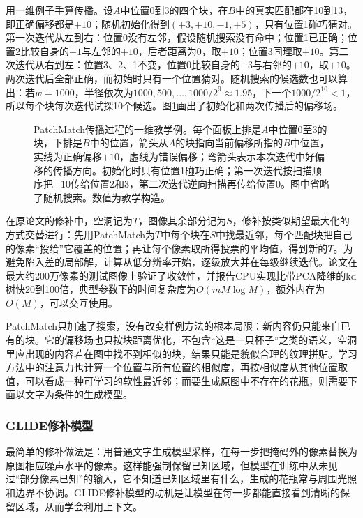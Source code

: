 用一维例子手算传播。设$A$中位置0到3的四个块，在$B$中的真实匹配都在10到13，即正确偏移都是$+10$；随机初始化得到$(+3,+10,-1,+5)$，只有位置1碰巧猜对。第一次迭代从左到右：位置0没有左邻，假设随机搜索没有命中；位置1已正确；位置2比较自身的$-1$与左邻的$+10$，后者距离为0，取$+10$；位置3同理取$+10$。第二次迭代从右到左：位置3、2、1不变，位置0比较自身的$+3$与右邻的$+10$，取$+10$。两次迭代后全部正确，而初始时只有一个位置猜对。随机搜索的候选数也可以算出：若$w=1000$，半径依次为$1000,500,\ldots,1000/2^9\approx1.95$，下一个$1000/2^{10}<1$，所以每个块每次迭代试探10个候选。图\ref{fig:vision-patchmatch-steps}画出了初始化和两次传播后的偏移场。

\begin{figure}[htbp]
 \centering
 
 \caption{PatchMatch传播过程的一维教学例。每个面板上排是$A$中位置0至3的块，下排是$B$中的位置，箭头从$A$的块指向当前偏移所指的$B$中位置，实线为正确偏移$+10$，虚线为错误偏移；弯箭头表示本次迭代中好偏移的传播方向。初始化时只有位置1碰巧正确；第一次迭代按扫描顺序把$+10$传给位置2和3，第二次迭代逆向扫描再传给位置0。图中省略了随机搜索。数值为教学构造。}
 \label{fig:vision-patchmatch-steps}
\end{figure}

在原论文的修补中，空洞记为$T$，图像其余部分记为$S$，修补按类似期望最大化的方式交替进行：先用PatchMatch为$T$中每个块在$S$中找最近邻，每个匹配块把自己的像素“投给”它覆盖的位置；再让每个像素取所得投票的平均值，得到新的$T$。为避免陷入差的局部解，计算从低分辨率开始，逐级放大并在每级继续迭代。论文在最大约200万像素的测试图像上验证了收敛性，并报告CPU实现比带PCA降维的kd树快20到100倍，典型参数下的时间复杂度为$O(mM\log M)$，额外内存为$O(M)$，可以交互使用。

PatchMatch只加速了搜索，没有改变样例方法的根本局限：新内容仍只能来自已有的块。它的偏移场也只按块距离优化，不包含“这是一只杯子”之类的语义，空洞里应出现的内容若在图中找不到相似的块，结果只能是貌似合理的纹理拼贴。学习方法中的注意力也计算一个位置与所有位置的相似度，再按相似度从其他位置取值，可以看成一种可学习的软性最近邻；而要生成原图中不存在的花瓶，则需要下面以文字为条件的生成模型。

\subsubsection{GLIDE修补模型}
\label{sec:vision-generation-glide-inpainting}

最简单的修补做法是：用普通文字生成模型采样，在每一步把掩码外的像素替换为原图相应噪声水平的像素。这样能强制保留已知区域，但模型在训练中从未见过“部分像素已知”的输入，它不知道已知区域里有什么，生成的花瓶常与周围光照和边界不协调。GLIDE修补模型的动机是让模型在每一步都能直接看到清晰的保留区域，从而学会利用上下文。

